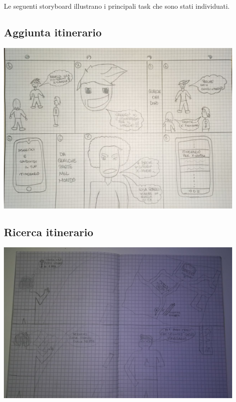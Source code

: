 Le seguenti storyboard illustrano i principali task che sono stati individuati.

\centering \subsection{Aggiunta itinerario}

\begin{center}
    \includegraphics[width=12.5cm]{../storyboards/Aggiunta.jpg}
\end{center}

\centering \subsection{Ricerca itinerario}

\begin{center}
    \includegraphics[width=12.5cm]{../storyboards/Ricerca.jpg}
\end{center}

